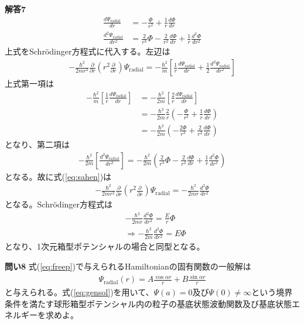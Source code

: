 \documentclass[11pt,pra,aps]{revtex4}
\begin{document}
\noindent
{\bf 解答7}
\begin{align}
  \frac{d\Psi_\text{radial}}{dr}&=-\frac{\Phi}{r^2}+\frac{1}{r}\frac{d\Phi}{dr} \\
  \frac{d^2\Psi_\text{radial}}{dr^2}&=\frac{2}{r^3}\Phi-\frac{2}{r^2}\frac{d\Phi}{dr}+\frac{1}{r}\frac{d^2\Phi}{dr^2}
\end{align}
上式をSchr\"odinger方程式に代入する。左辺は
\begin{align}
  -\frac{\hbar^2}{2mr^2}\frac{\partial}{\partial r}\left(r^2 \frac{\partial}{\partial r}\right)\Psi_\text{radial}=-\frac{\hbar^2}{m}\left[\frac{1}{r}\frac{d\Psi_\text{radial}}{dr}+\frac{1}{2}\frac{d^2\Psi_\text{radial}}{dr^2}\right]\label{eq:sahen}
\end{align}
上式第一項は
\begin{align}
  -\frac{\hbar^2}{m}\left[\frac{1}{r}\frac{d\Psi_\text{radial}}{dr}\right]&=-\frac{\hbar^2}{2m}\left[\frac{2}{r}\frac{d\Psi_\text{radial}}{dr}\right] \nonumber \\
  &=-\frac{\hbar^2}{2m}\frac{2}{r}\left(-\frac{\Phi}{r^2}+\frac{1}{r}\frac{d\Phi}{dr}\right) \nonumber \\
  &=-\frac{\hbar^2}{2m}\left(-\frac{2\Phi}{r^3}+\frac{2}{r^2}\frac{d\Phi}{dr}\right)
\end{align}
となり、第二項は
\begin{align}
  -\frac{\hbar^2}{2m}\left[\frac{d^2\Psi_\text{radial}}{dr^2}\right] = -\frac{\hbar^2}{2m}\left(\frac{2}{r^3}\Phi-\frac{2}{r^2}\frac{d\Phi}{dr}+\frac{1}{r}\frac{d^2\Phi}{dr^2}\right)
\end{align}
となる。故に式(\ref{eq:sahen})は
\begin{align}
-\frac{\hbar^2}{2mr^2}\frac{\partial}{\partial r}\left(r^2 \frac{\partial}{\partial r}\right)\Psi_\text{radial}=-\frac{\hbar^2}{2mr}\frac{d^2\Phi}{dr^2}
\end{align}
となる。Schr\"odinger方程式は
\begin{align}
  &-\frac{\hbar^2}{2mr}\frac{d^2\Phi}{dr^2}=\frac{E}{r}\Phi \\
  &\Rightarrow -\frac{\hbar^2}{2m}\frac{d^2\Phi}{dr^2}=E\Phi \label{eq:shroe}
\end{align}
となり、1次元箱型ポテンシャルの場合と同型となる。

\noindent
{\bf 問い8} 式(\ref{eq:freep})で与えられるHamiltonianの固有関数の一般解は
\begin{align}
  \Psi_\text{radial}(r)=A\frac{\cos\alpha r}{r} + B\frac{\sin\alpha r}{r} \label{eq:gensol}
\end{align}
と与えられる。式(\ref{eq:gensol})を用いて、$\Psi(a)=0$及び$\Psi(0)\neq\infty$という境界条件を満たす球形箱型ポテンシャル内の粒子の基底状態波動関数及び基底状態エネルギーを求めよ。
\end{document}
